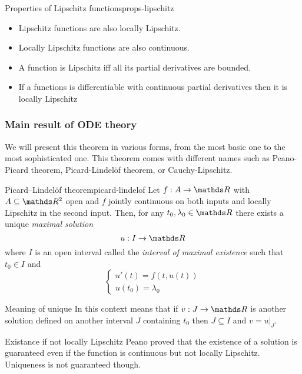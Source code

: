 \documentclass[12pt]{extarticle}
\begin{document}
\begin{proposition}{Properties of Lipschitz functions}{props-lipschitz}
	\begin{itemize}
		\item Lipschitz functions are also locally Lipschitz.
		\item Locally Lipschitz functions are also continuous.
		\item A function is Lipschitz iff all its partial derivatives are bounded.
		\item If a functions is differentiable with continuous partial derivatives then it is locally Lipschitz
	\end{itemize}
\end{proposition}

\subsubsection{Main result of ODE theory}

We will present this theorem in various forms, from the most basic one to the most sophisticated one.
This theorem comes with different names such as Peano-Picard theorem, Picard-Lindelöf theorem, or Cauchy-Lipschitz.

\begin{theorem}{Picard–Lindelöf theorem}{picard-lindelof}
	Let $f: A \to \R$ with $A \subseteq \R^2$ open and $f$ jointly continuous on both inputs and locally Lipschitz in the second input.
	Then, for any $t_0, \lambda_0 \in \R$ there exists a unique \emph{maximal solution}
	\begin{equation}
		u: I \to \R
	\end{equation}
	where $I$ is an open interval called the \emph{interval of maximal existence} such that $t_0 \in I$ and
	\begin{equation}
		\begin{cases}
			u'(t) = f(t, u(t)) \\
			u(t_0) = \lambda_0
		\end{cases}
	\end{equation}
\end{theorem}

\begin{remark}{Meaning of unique}{}
	In this context  means that if $v: J \to \R$ is another solution defined on another interval $J$ containing $t_0$ then $J \subseteq I$ and $v = u|_J$.
\end{remark}

\begin{remark}{Existance if not locally Lipschitz}{}
	Peano proved that the existence of a solution is guaranteed even if the function is continuous but not locally Lipschitz.
	Uniqueness is not guaranteed though.
\end{remark}
\end{document}
